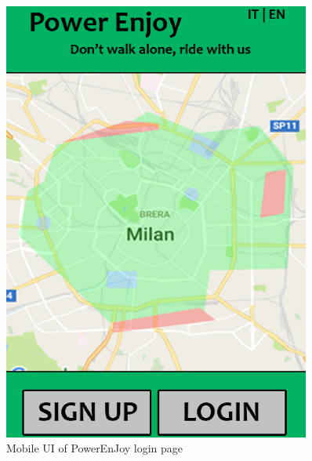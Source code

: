 \begin{figure}[t]
	\centering
	\begin{minipage}{0.45\textwidth}
		\centering
		\includegraphics[width=0.9\textwidth]{figures/mobile.eps} %
		\caption{Mobile UI of PowerEnJoy login page}
		\label{fig:mobile}
	\end{minipage}\hfill
	\begin{minipage}{0.45\textwidth}
		\centering

\end{minipage}
\end{figure}
